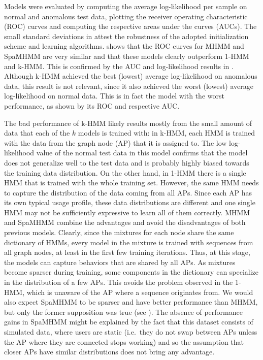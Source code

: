 Models were evaluated by computing the average log-likelihood per sample on normal and anomalous test data, plotting the receiver operating characteristic (ROC) curves and computing the respective areas under the curves (AUCs). The small standard deviations in  attest the robustness of the adopted initialization scheme and learning algorithms.  shows that the ROC curves for MHMM and SpaMHMM are very similar and that these models clearly outperform 1-HMM and k-HMM. This is confirmed by the AUC and log-likelihood results in . Although k-HMM achieved the best (lowest) average log-likelihood on anomalous data, this result is not relevant, since it also achieved the worst (lowest) average log-likelihood on normal data. This is in fact the model with the worst performance, as shown by its ROC and respective AUC.

The bad performance of k-HMM likely results mostly from the small amount of data that each of the $k$ models is trained with: in k-HMM, each HMM is trained with the data from the graph node (AP) that it is assigned to. The low log-likelihood value of the normal test data in this model confirms that the model does not generalize well to the test data and is probably highly biased towards the training data distribution. On the other hand, in 1-HMM there is a single HMM that is trained with the whole training set. However, the same HMM needs to capture the distribution of the data coming from all APs. Since each AP has its own typical usage profile, these data distributions are different and one single HMM may not be sufficiently expressive to learn all of them correctly. MHMM and SpaMHMM combine the advantages and avoid the disadvantages of both previous models. Clearly, since the mixtures for each node share the same dictionary of HMMs, every model in the mixture is trained with sequences from all graph nodes, at least in the first few training iterations. Thus, at this stage, the models can capture behaviors that are shared by all APs. As mixtures become sparser during training, some components in the dictionary can specialize in the distribution of a few APs. This avoids the problem observed in the 1-HMM, which is unaware of the AP where a sequence originates from. We would also expect SpaMHMM to be sparser and have better performance than MHMM, but only the former supposition was true (see ). The absence of performance gains in SpaMHMM might be explained by the fact that this dataset consists of simulated data, where users are static (i.e.\ they do not swap between APs unless the AP where they are connected stops working) and so the assumption that closer APs have similar distributions does not bring any advantage.

